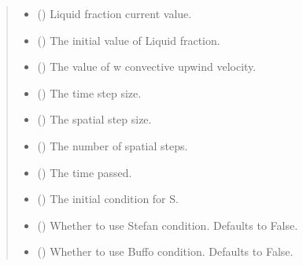 \documentclass[a4paper,11pt,english,openany]{sphinxmanual}
\begin{document}
\begin{fulllineitems}
\begin{quote}
\begin{description}
\begin{itemize}
\item {} 
\sphinxAtStartPar
{} () \textendash{} Liquid fraction current value.

\item {} 
\sphinxAtStartPar
{} () \textendash{} The initial value of Liquid fraction.

\item {} 
\sphinxAtStartPar
{} () \textendash{} The value of w convective upwind velocity.

\item {} 
\sphinxAtStartPar
{} () \textendash{} The time step size.

\item {} 
\sphinxAtStartPar
{} () \textendash{} The spatial step size.

\item {} 
\sphinxAtStartPar
{} () \textendash{} The number of spatial steps.

\item {} 
\sphinxAtStartPar
{} () \textendash{} The time passed.

\item {} 
\sphinxAtStartPar
{} () \textendash{} The initial condition for S.

\item {} 
\sphinxAtStartPar
{} (\sphinxstyleliteralemphasis{\sphinxupquote{, }}) \textendash{} Whether to use Stefan condition. Defaults to False.

\item {} 
\sphinxAtStartPar
{} (\sphinxstyleliteralemphasis{\sphinxupquote{, }}) \textendash{} Whether to use Buffo condition. Defaults to False.


\end{itemize}
\end{description}
\end{quote}
\end{fulllineitems}
\end{document}

